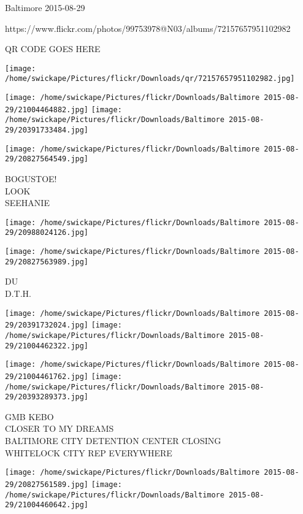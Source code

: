 \documentclass[10pt,letterpaper]{article}
\begin{document}
Baltimore 2015-08-29

https://www.flickr.com/photos/99753978@N03/albums/72157657951102982

QR CODE GOES HERE

\texttt{[image: /home/swickape/Pictures/flickr/Downloads/qr/72157657951102982.jpg]}
\pagebreak

\texttt{[image: /home/swickape/Pictures/flickr/Downloads/Baltimore 2015-08-29/21004464882.jpg]}
\texttt{[image: /home/swickape/Pictures/flickr/Downloads/Baltimore 2015-08-29/20391733484.jpg]}

\vspace{0.25in}
\texttt{[image: /home/swickape/Pictures/flickr/Downloads/Baltimore 2015-08-29/20827564549.jpg]}

BOGUSTOE!\\
LOOK\\
SEEHANIE\\
\pagebreak

\texttt{[image: /home/swickape/Pictures/flickr/Downloads/Baltimore 2015-08-29/20988024126.jpg]}

\vspace{0.25in}
\texttt{[image: /home/swickape/Pictures/flickr/Downloads/Baltimore 2015-08-29/20827563989.jpg]}

DU\\
D.T.H.\\
\pagebreak

\texttt{[image: /home/swickape/Pictures/flickr/Downloads/Baltimore 2015-08-29/20391732024.jpg]}
\texttt{[image: /home/swickape/Pictures/flickr/Downloads/Baltimore 2015-08-29/21004462322.jpg]}

\texttt{[image: /home/swickape/Pictures/flickr/Downloads/Baltimore 2015-08-29/21004461762.jpg]}
\texttt{[image: /home/swickape/Pictures/flickr/Downloads/Baltimore 2015-08-29/20393289373.jpg]}

GMB KEBO\\
CLOSER TO MY DREAMS\\
BALTIMORE CITY DETENTION CENTER CLOSING\\
WHITELOCK CITY REP EVERYWHERE\\
\pagebreak

\texttt{[image: /home/swickape/Pictures/flickr/Downloads/Baltimore 2015-08-29/20827561589.jpg]}
\texttt{[image: /home/swickape/Pictures/flickr/Downloads/Baltimore 2015-08-29/21004460642.jpg]}
\end{document}
